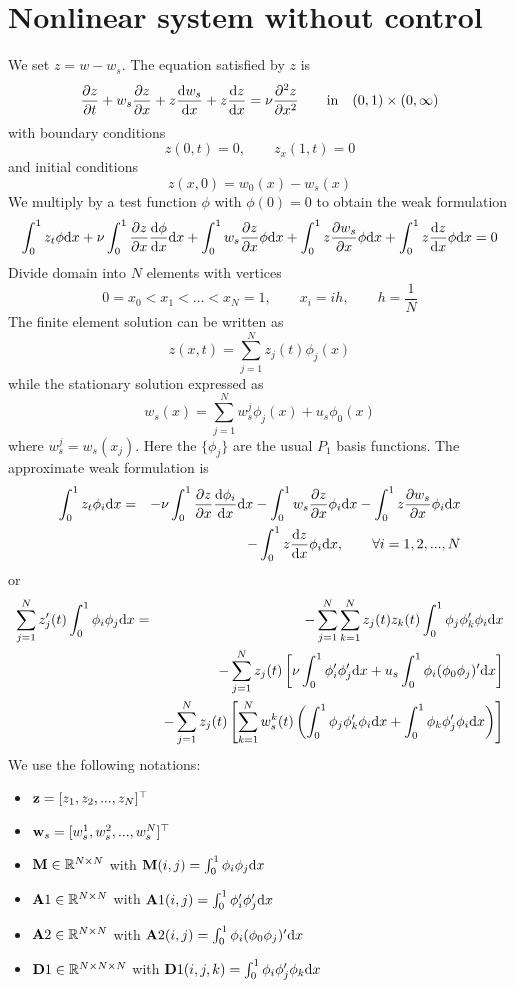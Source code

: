 \documentclass[12pt]{article}
\begin{document}
\section{Nonlinear system without control}
We set $z = w - w_s$. The equation satisfied by $z$ is
\begin{equation}
\frac{\partial z}{\partial t} + w_s \frac{\partial z}{\partial x} + z \frac{\textrm{d} w_s}{\textrm{d} x} + z \frac{\textrm{d} z}{\textrm{d} x} = \nu \frac{\partial ^2 z}{\partial x^2} \qquad \mbox{in} \quad (0,1)\times (0,\infty)
\end{equation}
with boundary conditions
\begin{equation}
z(0,t) = 0, \qquad z_x(1,t) = 0
\end{equation}
and initial conditions
\begin{equation}
z(x,0) = w_0(x) - w_s(x)
\end{equation}
We multiply by a test function $\phi$ with $\phi(0)=0$ to obtain the weak formulation
\[
\int_0^1 z_t \phi \textrm{d} x + \nu \int_0^1 \frac{\partial z}{\partial x} \frac{\textrm{d} \phi}{\textrm{d} x} \textrm{d} x + \int_0^1 w_s \frac{\partial z}{\partial x} \phi \textrm{d} x + \int_0^1 z \frac{\partial w_s}{\partial x} \phi \textrm{d} x + \int_0^1 z \frac{\textrm{d} z}{\textrm{d} x} \phi \textrm{d} x = 0
\]
Divide domain into $N$ elements with vertices
\[
0= x_0 < x_1 < \ldots < x_N = 1, \qquad x_i = ih, \qquad h = \frac{1}{N}
\]
The finite element solution can be written as
\[
z(x,t) = \sum_{j=1}^N z_j(t) \phi_j(x)
\]
while the stationary solution expressed as
\[
w_s(x) = \sum_{j=1}^N w_s^j \phi_j(x) + u_s \phi_0(x)
\]
where $w_s^j = w_s(x_j)$. Here the $\{ \phi_j \}$ are the usual $P_1$ basis functions. The approximate weak formulation is
\begin{eqnarray*}
\int_0^1 z_t \phi_i \textrm{d} x &=& - \nu \int_0^1 \frac{\partial z}{\partial x} \frac{\textrm{d} \phi_i}{\textrm{d} x} \textrm{d} x - \int_0^1 w_s \frac{\partial z}{\partial x} \phi_i \textrm{d} x - \int_0^1 z \frac{\partial w_s}{\partial x} \phi_i \textrm{d} x \\
&& - \int_0^1 z \frac{\textrm{d} z}{\textrm{d} x} \phi_i \textrm{d} x, \qquad \forall i = 1,2,...,N 
\end{eqnarray*}
or
\begin{eqnarray*}
\sum_{j=1}^N z_j'(t) \int_0^1 \phi_i \phi_j \textrm{d} x &=& - \sum_{j=1}^N \sum_{k=1}^N z_j(t) z_k(t) \int_0^1 \phi_j \phi_k' \phi_i  \textrm{d} x \\
&& - \sum_{j=1}^N z_j(t) \left [ \nu  \int_0^1 \phi_i' \phi_j' \textrm{d} x + u_s \int_0^1 \phi_i (\phi_0 \phi_j)' \textrm{d} x  \right ] \\
&& - \sum_{j=1}^N z_j(t) \left [  \sum_{k=1}^N w_s^k(t) \left ( \int_0^1 \phi_j \phi_k' \phi_i \textrm{d} x +  \int_0^1 \phi_k \phi_j' \phi_i \textrm{d} x \right ) \right]
\end{eqnarray*}
 We use the following notations:
\begin{itemize}
 \item ${\mathbf z} = [z_1,z_2,...,z_N]^\top$
 \item ${\mathbf w}_s = [w_s^1,w_s^2,...,w_s^N]^\top$
 \item ${\mathbf M} \in \mathbb{R}^{N \times N}$ with ${\mathbf M}(i,j) = \int_0^1 \phi_i\phi_j \textrm{d} x$
 \item ${\mathbf A}1 \in \mathbb{R}^{N \times N}$ with ${\mathbf A}1(i,j) = \int_0^1 \phi_i'\phi_j' \textrm{d} x$
 \item ${\mathbf A}2 \in \mathbb{R}^{N \times N}$ with ${\mathbf A}2(i,j) = \int_0^1 \phi_i(\phi_0 \phi_j)' \textrm{d} x$
 \item ${\mathbf D}1 \in \mathbb{R}^{N \times N \times N}$ with ${\mathbf D}1(i,j,k) = \int_0^1 \phi_i \phi_j' \phi_k \textrm{d} x$
\end{itemize}
\end{document}
